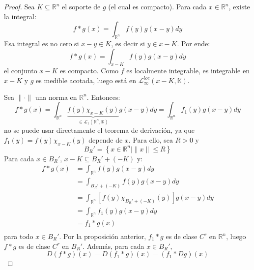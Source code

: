 \documentclass[12pt]{report}
\theoremstyle{largebreak}
\newcommand\norm[1]{\ensuremath{\|#1\|}}
\begin{document}
    \begin{proof}
        Sea $K\subseteq\mathbb{R}^n$ el soporte de $g$ (el cual es compacto). Para cada $x\in\mathbb{R}^n$, existe la integral:
        \begin{equation*}
            f*g(x)=\int_{\mathbb{R}^n}f(y)g(x-y)dy
        \end{equation*}
        Esa integral es no cero si $x-y\in K$, es decir si $y\in x-K$. Por ende:
        \begin{equation*}
            f*g(x)=\int_{x-K}f(y)g(x-y)dy
        \end{equation*}
        el conjunto $x-K$ es compacto. Como $f$ es localmente integrable, es integrable en $x-K$ y $g$ es medible acotada, luego está en $\mathcal{L}_\infty^{loc}(x-K,\mathbb{K})$.

        Sea $\norm{\cdot}$ una norma en $\mathbb{R}^n$. Entonces:
        \begin{equation*}
            f*g(x)=\int_{\mathbb{R}^n}\underbrace{f(y)\chi_{ x-K}(y)}_{\in\mathcal{L}_1(\mathbb{R}^n,\mathbb{K})}g(x-y)dy=\int_{\mathbb{R}^n}f_1(y)g(x-y)dy
        \end{equation*}
        no se puede usar directamente el teorema de derivación, ya que $f_1(y)=f(y)\chi_{ x-K}(y)$ depende de $x$. Para ello, sea $R>0$ y
        \begin{equation*}
            B_R'=\left\{x\in\mathbb{R}^n\Big|\norm{x}\leq R \right\}
        \end{equation*}
        Para cada $x\in B_R'$, $x-K\subseteq B_R'+(-K)$ y:
        \begin{equation*}
            \begin{split}
                f*g(x)&=\int_{\mathbb{R}^n}f(y)g(x-y)dy\\
                &=\int_{B_R'+(-K)}f(y)g(x-y)dy\\
                &=\int_{\mathbb{R}^n}\left[f(y)\chi_{B_R'+(-K)}(y) \right]g(x-y)dy\\
                &=\int_{\mathbb{R}^n}f_1(y)g(x-y)dy\\
                &=f_1*g(x)\\
            \end{split}
        \end{equation*}
        para todo $x\in B_R'$. Por la proposición anterior, $f_1*g$ es de clase $C^r$ en $\mathbb{R}^n$, luego $f*g$ es de clase $C^r$ en $B_R'$. Además, para cada $x\in B_R'$,
        \begin{equation*}
            D(f*g)(x)=D(f_1*g)(x)=(f_1*Dg)(x)

\end{equation*}
\end{proof}
\end{document}
